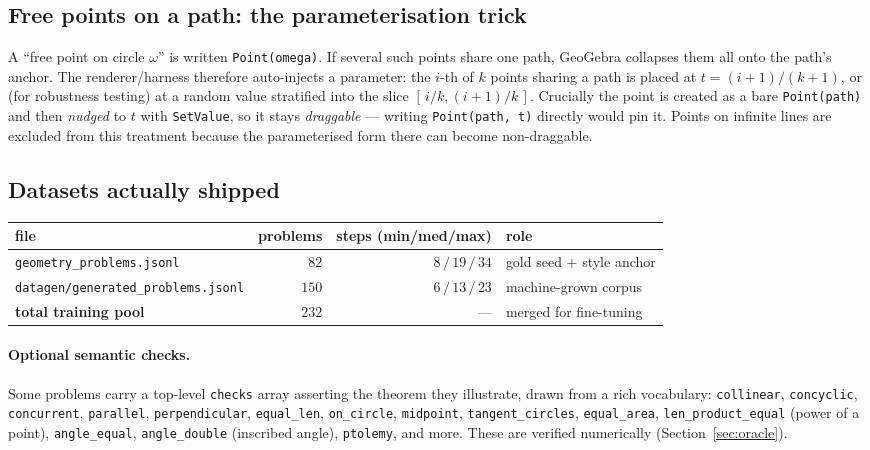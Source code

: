 \documentclass[11pt]{article}
\newcommand{\code}[1]{\texttt{\small #1}}
\begin{document}
\subsection{Free points on a path: the parameterisation trick}
A ``free point on circle $\omega$'' is written \code{Point(omega)}. If several
such points share one path, GeoGebra collapses them all onto the path's anchor.
The renderer/harness therefore auto-injects a parameter: the $i$-th of $k$
points sharing a path is placed at $t=(i+1)/(k+1)$, or (for robustness testing)
at a random value stratified into the slice $[\,i/k,(i+1)/k\,]$. Crucially the
point is created as a bare \code{Point(path)} and then \emph{nudged} to $t$ with
\code{SetValue}, so it stays \emph{draggable} --- writing \code{Point(path, t)}
directly would pin it. Points on infinite lines are excluded from this treatment
because the parameterised form there can become non-draggable.

\subsection{Datasets actually shipped}
\begin{center}
\begin{tabular}{@{}lrrl@{}}
\toprule
\textbf{file} & \textbf{problems} & \textbf{steps (min/med/max)} & \textbf{role}\\
\midrule
\code{geometry\_problems.jsonl}          & $82$  & $8\,/\,19\,/\,34$ & gold seed + style anchor\\
\code{datagen/generated\_problems.jsonl} & $150$ & $6\,/\,13\,/\,23$ & machine-grown corpus\\
\midrule
\textbf{total training pool}             & $232$ & --- & merged for fine-tuning\\
\bottomrule
\end{tabular}
\end{center}

\paragraph{Optional semantic checks.} Some problems carry a top-level
\code{checks} array asserting the theorem they illustrate, drawn from a rich
vocabulary: \code{collinear}, \code{concyclic}, \code{concurrent},
\code{parallel}, \code{perpendicular}, \code{equal\_len}, \code{on\_circle},
\code{midpoint}, \code{tangent\_circles}, \code{equal\_area},
\code{len\_product\_equal} (power of a point), \code{angle\_equal},
\code{angle\_double} (inscribed angle), \code{ptolemy}, and more. These are
verified numerically (Section~\ref{sec:oracle}).
\end{document}
